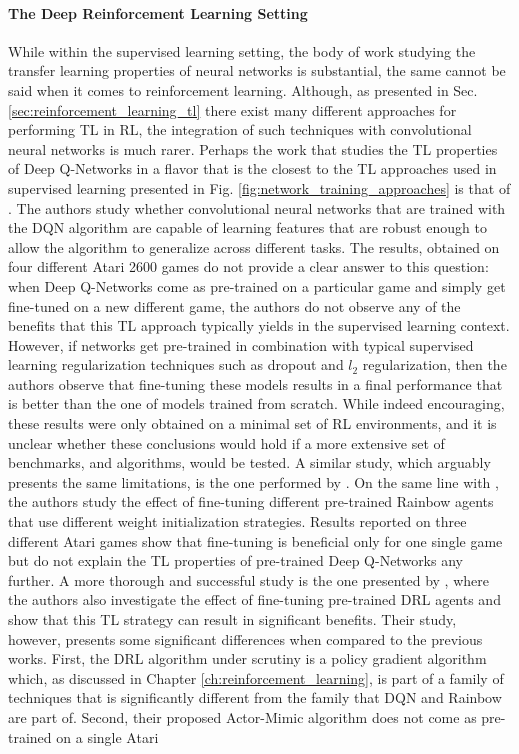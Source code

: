 \paragraph{\textbf{\uppercase{T}he \uppercase{D}eep \uppercase{R}einforcement \uppercase{L}earning \uppercase{S}etting}}
While within the supervised learning setting, the body of work studying the transfer learning properties of neural networks is substantial, the same cannot be said when it comes to reinforcement learning. Although, as presented in Sec. \ref{sec:reinforcement_learning_tl} there exist many different approaches for performing TL in RL, the integration of such techniques with convolutional neural networks is much rarer. Perhaps the work that studies the TL properties of Deep Q-Networks in a flavor that is the closest to the TL approaches used in supervised learning presented in Fig. \ref{fig:network_training_approaches} is that of \citet{farebrother2018generalization}. The authors study whether convolutional neural networks that are trained with the DQN algorithm \cite{mnih2015human} are capable of learning features that are robust enough to allow the algorithm to generalize across different tasks. The results, obtained on four different Atari 2600 games do not provide a clear answer to this question: when Deep Q-Networks come as pre-trained on a particular game and simply get fine-tuned on a new different game, the authors do not observe any of the benefits that this TL approach typically yields in the supervised learning context. However, if networks get pre-trained in combination with typical supervised learning regularization techniques such as dropout \cite{srivastava2014dropout} and $l_2$ regularization, then the authors observe that fine-tuning these models results in a final performance that is better than the one of models trained from scratch. While indeed encouraging, these results were only obtained on a minimal set of RL environments, and it is unclear whether these conclusions would hold if a more extensive set of benchmarks, and algorithms, would be tested. A similar study, which arguably presents the same limitations, is the one performed by \citet{tyo2020transferable}. On the same line with \citet{farebrother2018generalization}, the authors study the effect of fine-tuning different pre-trained Rainbow agents \cite{hessel2018rainbow} that use different weight initialization strategies. Results reported on three different Atari games show that fine-tuning is beneficial only for one single game but do not explain the TL properties of pre-trained Deep Q-Networks any further. A more thorough and successful study is the one presented by \citet{parisotto2015actor}, where the authors also investigate the effect of fine-tuning pre-trained DRL agents and show that this TL strategy can result in significant benefits. Their study, however, presents some significant differences when compared to the previous works. First, the DRL algorithm under scrutiny is a policy gradient algorithm which, as discussed in Chapter \ref{ch:reinforcement_learning}, is part of a family of techniques that is significantly different from the family that DQN and Rainbow are part of. Second, their proposed Actor-Mimic algorithm does not come as pre-trained on a single Atari 